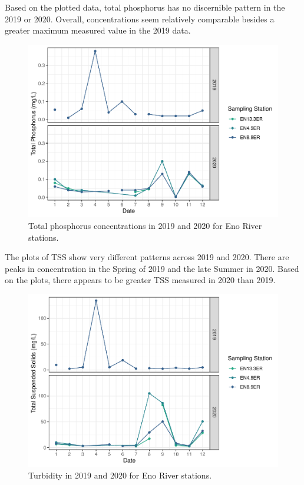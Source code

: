 \documentclass[
  12pt,
]{article}
\begin{document}
Based on the plotted data, total phosphorus has no discernible pattern
in the 2019 or 2020. Overall, concentrations seem relatively comparable
besides a greater maximum measured value in the 2019 data.

\begin{figure}
\centering
\includegraphics{August_Lindborg_ENV872_Project_files/figure-latex/unnamed-chunk-9-1.pdf}
\caption{Total phosphorus concentrations in 2019 and 2020 for Eno River
stations.}
\end{figure}

The plots of TSS show very different patterns across 2019 and 2020.
There are peaks in concentration in the Spring of 2019 and the late
Summer in 2020. Based on the plots, there appears to be greater TSS
measured in 2020 than 2019.

\begin{figure}
\centering
\includegraphics{August_Lindborg_ENV872_Project_files/figure-latex/unnamed-chunk-10-1.pdf}
\caption{Turbidity in 2019 and 2020 for Eno River stations.}
\end{figure}
\end{document}
